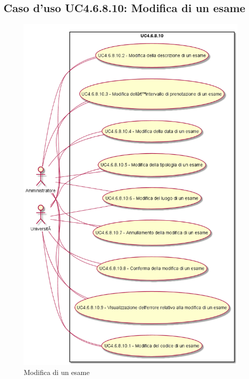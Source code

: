 \subsection{Caso d'uso \texorpdfstring{UC4.6.8.10}{UC4.6.8.10}: Modifica di un esame}
\begin{figure} [H]
\centering
\includegraphics[scale=0.45]{./img/UC4-6-8-10.png}
\caption{Modifica di un esame}\label{}
\end{figure}
